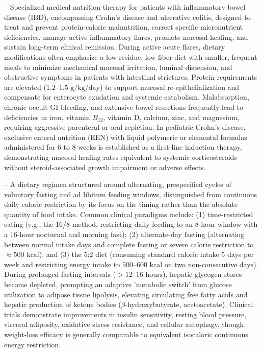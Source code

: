 -- Specialized medical nutrition therapy for patients with inflammatory bowel disease (IBD), encompassing Crohn's disease and ulcerative colitis, designed to treat and prevent protein-calorie malnutrition, correct specific micronutrient deficiencies, manage active inflammatory flares, promote mucosal healing, and sustain long-term clinical remission. During active acute flares, dietary modifications often emphasize a low-residue, low-fiber diet with smaller, frequent meals to minimize mechanical mucosal irritation, luminal distension, and obstructive symptoms in patients with intestinal strictures. Protein requirements are elevated ($1.2\text{--}1.5\text{ g/kg/day}$) to support mucosal re-epithelialization and compensate for enterocyte exudation and systemic catabolism. Malabsorption, chronic occult GI bleeding, and extensive bowel resections frequently lead to deficiencies in iron, vitamin $B_{12}$, vitamin D, calcium, zinc, and magnesium, requiring aggressive parenteral or oral repletion. In pediatric Crohn's disease, exclusive enteral nutrition (EEN) with liquid polymeric or elemental formulas administered for 6 to 8 weeks is established as a first-line induction therapy, demonstrating mucosal healing rates equivalent to systemic corticosteroids without steroid-associated growth impairment or adverse effects.

-- A dietary regimen structured around alternating, prespecified cycles of voluntary fasting and ad libitum feeding windows, distinguished from continuous daily caloric restriction by its focus on the timing rather than the absolute quantity of food intake. Common clinical paradigms include: (1) time-restricted eating (e.g., the 16/8 method, restricting daily feeding to an 8-hour window with a 16-hour nocturnal and morning fast); (2) alternate-day fasting (alternating between normal intake days and complete fasting or severe calorie restriction to $\approx 500\text{ kcal}$); and (3) the 5:2 diet (consuming standard caloric intake 5 days per week and restricting energy intake to $500\text{--}600\text{ kcal}$ on two non-consecutive days). During prolonged fasting intervals ($>12\text{--}16\text{ hours}$), hepatic glycogen stores become depleted, prompting an adaptive 'metabolic switch' from glucose utilization to adipose tissue lipolysis, elevating circulating free fatty acids and hepatic production of ketone bodies ($\beta$-hydroxybutyrate, acetoacetate). Clinical trials demonstrate improvements in insulin sensitivity, resting blood pressure, visceral adiposity, oxidative stress resistance, and cellular autophagy, though weight-loss efficacy is generally comparable to equivalent isocaloric continuous energy restriction.

